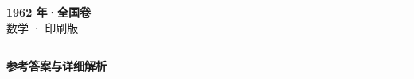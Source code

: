 \documentclass[zihao=5, a4paper]{ctexart}
\begin{document}
\begin{center}
  {\Large\bfseries 1962 年·全国卷}\\[4pt]
  {\large 数学 · 印刷版}
\end{center}
\medskip
{}

\par\bigskip\hrule\bigskip
{}
\begin{center}{\large\bfseries 参考答案与详细解析}\end{center}
\smallskip

\end{document}
